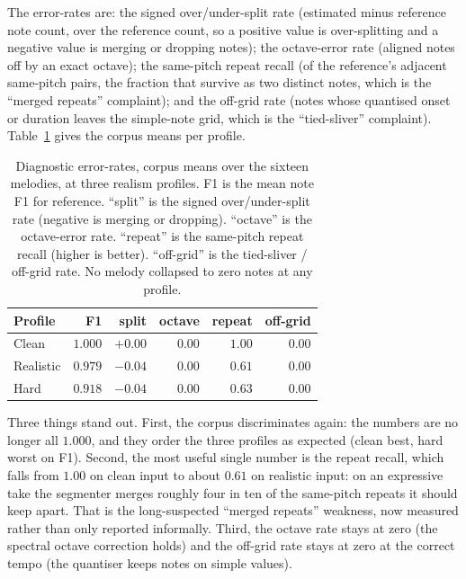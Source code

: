 \documentclass[12pt,a4paper]{article}
\begin{document}
The error-rates are: the signed over/under-split rate (estimated minus reference
note count, over the reference count, so a positive value is over-splitting and a
negative value is merging or dropping notes); the octave-error rate (aligned
notes off by an exact octave); the same-pitch repeat recall (of the reference's
adjacent same-pitch pairs, the fraction that survive as two distinct notes, which
is the ``merged repeats'' complaint); and the off-grid rate (notes whose
quantised onset or duration leaves the simple-note grid, which is the
``tied-sliver'' complaint). Table~\ref{tab:diag} gives the corpus means per
profile.

\begin{table}[H]
\centering
\caption{Diagnostic error-rates, corpus means over the sixteen melodies, at three
realism profiles. F1 is the mean note F1 for reference. ``split'' is the signed
over/under-split rate (negative is merging or dropping). ``octave'' is the
octave-error rate. ``repeat'' is the same-pitch repeat recall (higher is better).
``off-grid'' is the tied-sliver / off-grid rate. No melody collapsed to zero
notes at any profile.}
\label{tab:diag}
\begin{tabular}{l r r r r r}
\toprule
\textbf{Profile} & \textbf{F1} & \textbf{split} & \textbf{octave} &
\textbf{repeat} & \textbf{off-grid} \\
\midrule
Clean      & $1.000$ & $+0.00$ & $0.00$ & $1.00$ & $0.00$ \\
Realistic  & $0.979$ & $-0.04$ & $0.00$ & $0.61$ & $0.00$ \\
Hard       & $0.918$ & $-0.04$ & $0.00$ & $0.63$ & $0.00$ \\
\bottomrule
\end{tabular}
\end{table}

Three things stand out. First, the corpus discriminates again: the numbers are no
longer all $1.000$, and they order the three profiles as expected (clean best,
hard worst on F1). Second, the most useful single number is the repeat recall,
which falls from $1.00$ on clean input to about $0.61$ on realistic input: on an
expressive take the segmenter merges roughly four in ten of the same-pitch
repeats it should keep apart. That is the long-suspected ``merged repeats''
weakness, now measured rather than only reported informally. Third, the octave
rate stays at zero (the spectral octave correction holds) and the off-grid rate
stays at zero at the correct tempo (the quantiser keeps notes on simple values).
\end{document}
